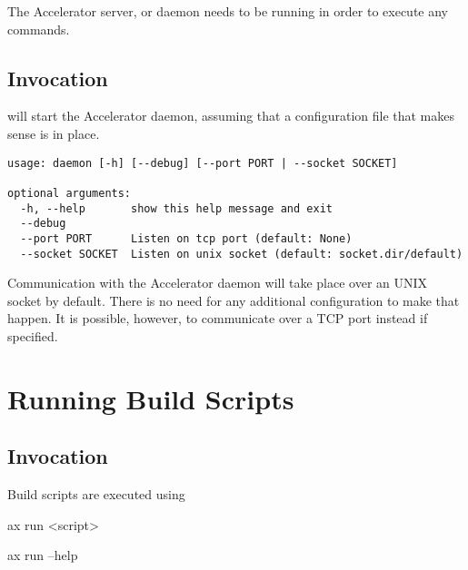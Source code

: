The Accelerator server, or daemon needs to be running in order to
execute any commands.

\subsection{Invocation}
\begin{shell}
\end{shell}
will start the Accelerator daemon, assuming that a configuration file
that makes sense is in place.
\begin{shell}
\end{shell}
\begin{snugshade}
\begin{verbatim}
usage: daemon [-h] [--debug] [--port PORT | --socket SOCKET]

optional arguments:
  -h, --help       show this help message and exit
  --debug
  --port PORT      Listen on tcp port (default: None)
  --socket SOCKET  Listen on unix socket (default: socket.dir/default)
\end{verbatim}%
\end{snugshade}
Communication with the Accelerator daemon will take place over an UNIX
socket by default.  There is no need for any additional configuration
to make that happen.  It is possible, however, to communicate over a
TCP port instead if specified.





\section{Running Build Scripts}
\label{sec:exec_runner}

\subsection{Invocation}
Build scripts are executed using
\begin{python}
ax run <script>
\end{python}

\begin{python}
ax run --help
\end{python}

